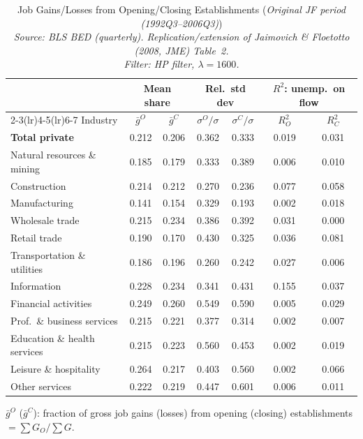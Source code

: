\begin{table}[htbp]
\centering
\small
\caption{Job Gains/Losses from Opening/Closing Establishments (\emph{Original JF period (1992Q3--2006Q3)}) \\
  \emph{Source: BLS BED (quarterly). Replication/extension of Jaimovich \& Floetotto (2008, JME) Table~2.} \\  \emph{Filter: HP filter, $\lambda=1600$.}}
\label{tab:jf_t2_jf_orig_hp}
\begin{tabular}{lcccccc}
\toprule
 & \multicolumn{2}{c}{Mean share} & \multicolumn{2}{c}{Rel.\ std dev} & \multicolumn{2}{c}{$R^2$: unemp.\ on flow} \\
\cmidrule(lr){2-3}\cmidrule(lr){4-5}\cmidrule(lr){6-7}
Industry & $\bar{g}^O$ & $\bar{g}^C$ & $\sigma^O/\sigma$ & $\sigma^C/\sigma$ & $R^2_O$ & $R^2_C$ \\
\midrule
\midrule
\textbf{Total private} & 0.212 & 0.206 & 0.362 & 0.333 & 0.019 & 0.031 \\
Natural resources \& mining & 0.185 & 0.179 & 0.333 & 0.389 & 0.006 & 0.010 \\
Construction & 0.214 & 0.212 & 0.270 & 0.236 & 0.077 & 0.058 \\
Manufacturing & 0.141 & 0.154 & 0.329 & 0.193 & 0.002 & 0.018 \\
Wholesale trade & 0.215 & 0.234 & 0.386 & 0.392 & 0.031 & 0.000 \\
Retail trade & 0.190 & 0.170 & 0.430 & 0.325 & 0.036 & 0.081 \\
Transportation \& utilities & 0.186 & 0.196 & 0.260 & 0.242 & 0.027 & 0.006 \\
Information & 0.228 & 0.234 & 0.341 & 0.431 & 0.155 & 0.037 \\
Financial activities & 0.249 & 0.260 & 0.549 & 0.590 & 0.005 & 0.029 \\
Prof.~\& business services & 0.215 & 0.221 & 0.377 & 0.314 & 0.002 & 0.007 \\
Education \& health services & 0.215 & 0.223 & 0.560 & 0.453 & 0.002 & 0.019 \\
Leisure \& hospitality & 0.264 & 0.217 & 0.403 & 0.560 & 0.002 & 0.066 \\
Other services & 0.222 & 0.219 & 0.447 & 0.601 & 0.006 & 0.011 \\
\bottomrule
\end{tabular}
\begin{tablenotes}[flushleft]\footnotesize
\item $\bar{g}^O$ ($\bar{g}^C$): fraction of gross job gains (losses) from opening (closing) establishments $= \sum G_O / \sum G$.

\end{tablenotes}
\end{table}
